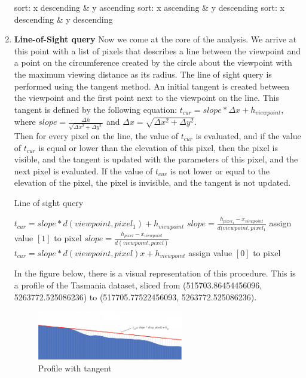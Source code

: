 \documentclass[a4paper]{article}
\begin{document}
\begin{enumerate}
\begin{algorithm}
\begin{algorithmic}[1]
		\State sort: x descending \& y ascending
		\State sort: x ascending \& y descending
		\State sort: x descending \& y descending 
		\EndIf
	\end{algorithmic} 
\end{algorithm}   
    \item{\bfseries{Line-of-Sight query}}\newline
    Now we come at the core of the analysis. We arrive at this point with a list of pixels that describes a line between the viewpoint and a point on the circumference created by the circle about the viewpoint with the maximum viewing distance as its radius. The line of sight query is performed using the tangent method. An initial tangent is created between the viewpoint and the first point next to the viewpoint on the line. This tangent is defined by the following equation: $t_{cur}= slope * \Delta x +h_{viewpoint}$,\\
    where $slope =\frac{\Delta h}{\sqrt{\Delta x^2 +\Delta y^2}} $
    and $\Delta x=\sqrt{\Delta x^2 +\Delta y^2}$.\\
    Then for every pixel on the line, the value of $t_{cur}$ is evaluated, and if the value of $t_{cur}$ is equal or lower than the elevation of this pixel, then the pixel is visible, and the tangent is updated with the parameters of this pixel, and the next pixel is evaluated. If the value of $t_{cur}$ is not lower or equal to the elevation of the pixel, the pixel is invisible, and the tangent is not updated.
\begin{algorithm}[H]
	\caption{Line of sight query} 
	\begin{algorithmic}[1]
	\State $t_{cur}= slope * d(viewpoint, pixel_1) +h_{viewpoint}$
	\State $slope =\frac{h_{pixel_1} - x_{viewpoint}}{d(viewpoint,pixel_1}$ 
		    \State assign value $[1]$ to pixel
		    \State $slope =\frac{h_{pixel} - x_{viewpoint}}{d(viewpoint, pixel)}$
		    \State $t_{cur}= slope * d(viewpoint, pixel) x +h_{viewpoint}$
		    \Else{}
		    \State assign value $[0]$ to pixel
		    \EndIf
		\EndFor
	\end{algorithmic} 
\end{algorithm}      
In the figure below, there is a visual representation of this procedure. This is a profile of the Tasmania dataset, sliced from (515703.86454456096, 5263772.525086236) to (517705.77522456093, 5263772.525086236). 
\begin{figure}[H]    
\centering
\includegraphics[width = 0.6\textwidth]{images/profile.png}
\caption{Profile with tangent}
\label{fig:tangent}
\end{figure}
\end{enumerate}
\end{document}
